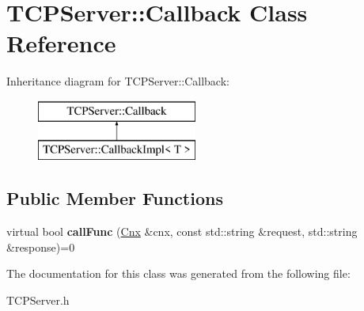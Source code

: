 \hypertarget{class_t_c_p_server_1_1_callback}{\section{T\-C\-P\-Server\-:\-:Callback Class Reference}
\label{class_t_c_p_server_1_1_callback}
}
Inheritance diagram for T\-C\-P\-Server\-:\-:Callback\-:\begin{figure}[H]
\begin{center}
\leavevmode
\includegraphics[height=2.000000cm]{class_t_c_p_server_1_1_callback}
\end{center}
\end{figure}
\subsection*{Public Member Functions}
\begin{DoxyCompactItemize}
\item 
\hypertarget{class_t_c_p_server_1_1_callback_a0d26469a5cfb3f5f0b3529cacb5d1615}{virtual bool {\bfseries call\-Func} (\hyperlink{class_t_c_p_server_1_1_cnx}{Cnx} \&cnx, const std\-::string \&request, std\-::string \&response)=0}\label{class_t_c_p_server_1_1_callback_a0d26469a5cfb3f5f0b3529cacb5d1615}

\end{DoxyCompactItemize}


The documentation for this class was generated from the following file\-:\begin{DoxyCompactItemize}
\item 
T\-C\-P\-Server.\-h\end{DoxyCompactItemize}
